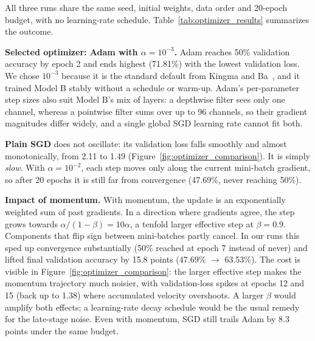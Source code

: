 \documentclass[11pt,a4paper]{article}
\begin{document}
All three runs share the same seed, initial weights, data order and 20-epoch budget, with no learning-rate schedule. Table~\ref{tab:optimizer_results} summarizes the outcome.

\begin{table}[H]
  \centering
  \caption{Optimizer ablation on Model B (20 epochs, seed 42, identical initialization).}
  \label{tab:optimizer_results}
\end{table}

\textbf{Selected optimizer: Adam with $\alpha = 10^{-3}$.} Adam reaches 50\% validation accuracy by epoch 2 and ends highest (71.81\%) with the lowest validation loss. We chose $10^{-3}$ because it is the standard default from Kingma and Ba~\cite{adam}, and it trained Model B stably without a schedule or warm-up. Adam's per-parameter step sizes also suit Model B's mix of layers: a depthwise filter sees only one channel, whereas a pointwise filter sums over up to 96 channels, so their gradient magnitudes differ widely, and a single global SGD learning rate cannot fit both.

\textbf{Plain SGD} does not oscillate: its validation loss falls smoothly and almost monotonically, from 2.11 to 1.49 (Figure~\ref{fig:optimizer_comparison}). It is simply \emph{slow}. With $\alpha = 10^{-2}$, each step moves only along the current mini-batch gradient, so after 20 epochs it is still far from convergence (47.69\%, never reaching 50\%).

\textbf{Impact of momentum.} With momentum, the update is an exponentially weighted sum of past gradients. In a direction where gradients agree, the step grows towards $\alpha / (1 - \beta) = 10\alpha$, a tenfold larger effective step at $\beta = 0.9$. Components that flip sign between mini-batches partly cancel. In our runs this sped up convergence substantially (50\% reached at epoch 7 instead of never) and lifted final validation accuracy by 15.8 points (47.69\% $\to$ 63.53\%). The cost is visible in Figure~\ref{fig:optimizer_comparison}: the larger effective step makes the momentum trajectory much noisier, with validation-loss spikes at epochs 12 and 15 (back up to 1.38) where accumulated velocity overshoots. A larger $\beta$ would amplify both effects; a learning-rate decay schedule would be the usual remedy for the late-stage noise. Even with momentum, SGD still trails Adam by 8.3 points under the same budget.
\end{document}
